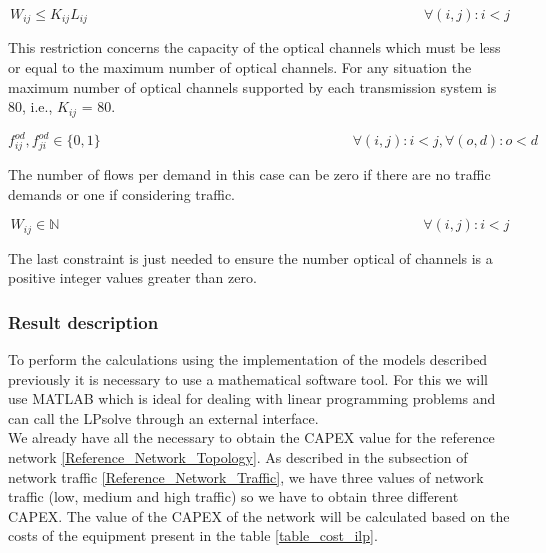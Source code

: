 \begin{equation}
W_{ij} \leq K_{ij} L_{ij} \qquad  \qquad \qquad \qquad \qquad \qquad \qquad \qquad \qquad \qquad \qquad \qquad \forall(i,j) : i < j
\label{ILPOpaque5_Surv}
\end{equation}

This restriction concerns the capacity of the optical channels which must be less or equal to the maximum number of optical channels. For any situation the maximum number of optical channels supported by each transmission system is 80, i.e., $K_{ij}$ = 80.

\begin{equation}
f_{ij}^{od} , f_{ji}^{od} \in \{0,1\}   \qquad \qquad \qquad \qquad \qquad \qquad \qquad \qquad \qquad
\forall(i,j) : i < j, \forall(o,d) : o < d
\label{ILPOpaque6_Surv}
\end{equation}

The number of flows per demand in this case can be zero if there are no traffic demands or one if considering traffic.

\begin{equation}
W_{ij} \in \mathbb{N}  \qquad \qquad \qquad \qquad \qquad \qquad \qquad \qquad \qquad \qquad \qquad \qquad \qquad
\forall(i,j) : i < j
\label{ILPOpaque7_Surv}
\end{equation}

The last constraint is just needed to ensure the number optical of channels is a positive integer values greater than zero.\\


\subsubsection{Result description}

To perform the calculations using the implementation of the models described previously it is necessary to use a mathematical software tool. For this we will use MATLAB which is ideal for dealing with linear programming problems and can call the LPsolve through an external interface.\\
We already have all the necessary to obtain the CAPEX value for the reference network \ref{Reference_Network_Topology}. As described in the subsection of network traffic \ref{Reference_Network_Traffic}, we have three values of network traffic (low, medium and high traffic) so we have to obtain three different CAPEX.
The value of the CAPEX of the network will be calculated based on the costs of the equipment present in the table \ref{table_cost_ilp}.\\


